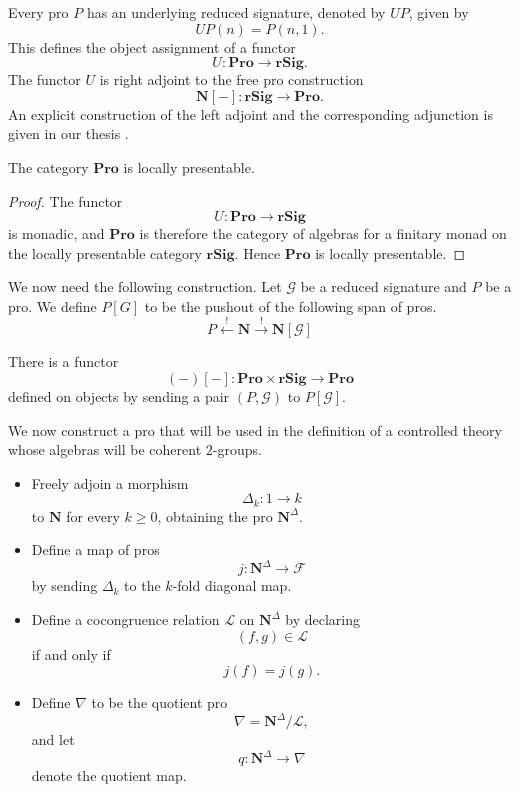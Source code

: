 \documentclass{tac}
\begin{document}
Every pro $P$ has an underlying reduced signature, denoted by $UP$, given by
\[
UP(n)=P(n,1).
\]
This defines the object assignment of a functor
\[
U:\mathbf{Pro}\to\mathbf{rSig}.
\]
The functor $U$ is right adjoint to the free pro construction
\[
\mathbf{N}[-]:\mathbf{rSig}\to\mathbf{Pro}.
\]
An explicit construction of the left adjoint and the corresponding adjunction is given in our thesis \cite{Taylor2026}.

\begin{lemma}
The category $\mathbf{Pro}$ is locally presentable.
\end{lemma}

\begin{proof}
The functor
\[
U:\mathbf{Pro}\to\mathbf{rSig}
\]
is monadic, and $\mathbf{Pro}$ is therefore the category of algebras for a finitary monad on the locally presentable category $\mathbf{rSig}$. Hence $\mathbf{Pro}$ is locally presentable.
\end{proof}

We now need the following construction. Let $\mathcal{G}$ be a reduced signature and $P$ be a pro. We define $P[G]$ to be the pushout of the following span of pros.
\[
P\xleftarrow{!}\mathbf{N}\xrightarrow{!}\mathbf{N}[\mathcal{G}]
\]

\begin{lemma}
There is a functor 
\[
(-)[-]:\mathbf{Pro}\times\mathbf{rSig}\to\mathbf{Pro}
\]
defined on objects by sending a pair $(P,\mathcal{G})$ to $P[\mathcal{G}]$.
\end{lemma}

We now construct a pro that will be used in the definition of a controlled theory whose algebras will be coherent $2$-groups.
\begin{itemize}
    \item Freely adjoin a morphism
    \[
    \Delta_k:1\to k
    \]
    to $\mathbf{N}$ for every $k\geq0$, obtaining the pro $\mathbf{N}^{\Delta}$.
    
    \item Define a map of pros
    \[
    j:\mathbf{N}^{\Delta}\to\mathcal{F}
    \]
    by sending $\Delta_k$ to the $k$-fold diagonal map.
    
    \item Define a cocongruence relation $\mathcal{L}$ on $\mathbf{N}^{\Delta}$ by declaring
    \[
    (f,g)\in\mathcal{L}
    \]
    if and only if
    \[
    j(f)=j(g).
    \]
    
    \item Define $\nabla$ to be the quotient pro
    \[
    \nabla=\mathbf{N}^{\Delta}/\mathcal{L},
    \]
    and let
    \[
    q:\mathbf{N}^{\Delta}\to\nabla
    \]
    denote the quotient map.
\end{itemize}
\end{document}
